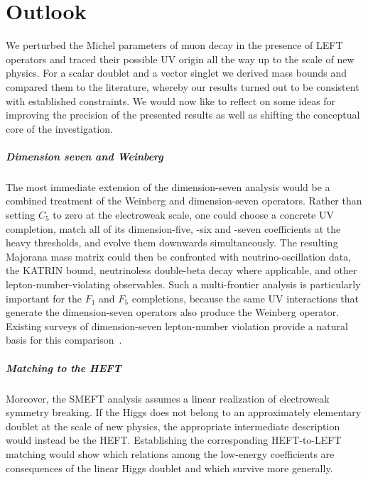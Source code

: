 \chapter{Outlook}
We perturbed the Michel parameters of muon decay in the presence of LEFT operators and traced their possible UV origin all the way up to the scale of new physics. For a scalar doublet and a vector singlet we derived mass bounds and compared them to the literature, whereby our results turned out to be consistent with established constraints. We would now like to reflect on some ideas for improving the precision of the presented results as well as shifting the conceptual core of the investigation.
\paragraph*{Dimension seven and Weinberg}
The most immediate extension of the dimension-seven analysis would be
a combined treatment of the Weinberg and dimension-seven operators.
Rather than setting $C_5$ to zero at the electroweak scale, one could
choose a concrete UV completion, match all of its dimension-five,
-six and -seven coefficients at the heavy thresholds, and evolve them
downwards simultaneously. The resulting Majorana mass matrix could
then be confronted with neutrino-oscillation data, the KATRIN
bound, neutrinoless double-beta decay where applicable, and other
lepton-number-violating observables. Such a multi-frontier analysis is
particularly important for the $F_1$ and $F_5$ completions, because
the same UV interactions that generate the dimension-seven operators
also produce the Weinberg operator. Existing surveys of
dimension-seven lepton-number violation provide a natural basis for
this comparison~\parencite{fridell2024probing}.
\paragraph*{Matching to the HEFT}
Moreover, the SMEFT analysis assumes a linear realization of
electroweak symmetry breaking. If the Higgs does not belong to an
approximately elementary doublet at the scale of new physics, the
appropriate intermediate description would instead be the HEFT.
Establishing the corresponding HEFT-to-LEFT matching would show which
relations among the low-energy coefficients are consequences of the
linear Higgs doublet and which survive more generally.
